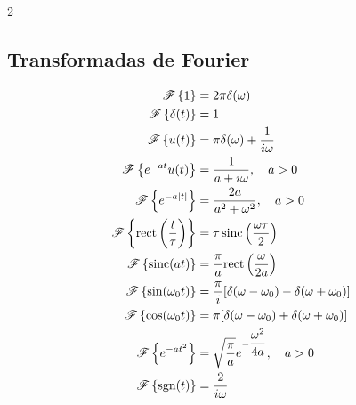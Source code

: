 \documentclass{article}
\begin{document}
\begin{multicols}{2}

\subsection{Transformadas de Fourier}
$$
\begin{aligned}
  \mathscr{F}\left\{1\right\} &= 2\pi\delta(\omega)\\
  \mathscr{F}\left\{\delta(t)\right\} &= 1\\
  \mathscr{F}\left\{u(t)\right\} &= \pi\delta(\omega) + \frac{1}{i\omega}\\
  \mathscr{F}\left\{e^{-at}u(t)\right\} &= \frac{1}{a + i\omega}, \quad a > 0\\
  \mathscr{F}\left\{e^{-a|t|}\right\} &= \frac{2a}{a^2 + \omega^2}, \quad a > 0\\
  \mathscr{F}\left\{\text{rect}\left(\frac{t}{\tau}\right)\right\} &= \tau\,\text{sinc}\left(\frac{\omega\tau}{2}\right)\\
  \mathscr{F}\left\{\text{sinc}(at)\right\} &= \frac{\pi}{a}\text{rect}\left(\frac{\omega}{2a}\right)\\
  \mathscr{F}\left\{\sin(\omega_0 t)\right\} &= \frac{\pi}{i}[\delta(\omega - \omega_0) - \delta(\omega + \omega_0)]\\
  \mathscr{F}\left\{\cos(\omega_0 t)\right\} &= \pi[\delta(\omega - \omega_0) + \delta(\omega + \omega_0)]\\
  \mathscr{F}\left\{e^{-at^2}\right\} &= \sqrt{\frac{\pi}{a}}e^{-\dfrac{\omega^2}{4a}}, \quad a > 0\\
  \mathscr{F}\left\{\text{sgn}(t)\right\} &= \frac{2}{i\omega}\\
\end{aligned}
$$
\columnbreak


\end{multicols}
\end{document}

